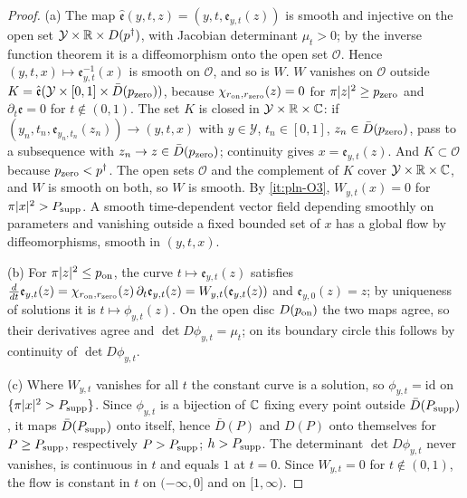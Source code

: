 \begin{proof}
(a) The map $\hat{\mathfrak e}(y,t,z)=(y,t,\mathfrak e_{y,t}(z))$ is smooth and injective on the open set
$\mathcal Y\times\mathbb{R}\times D(p^\dagger)$, with Jacobian determinant $\mu_t>0$; by the inverse function theorem it is a
diffeomorphism onto the open set $\mathcal O$. Hence $(y,t,x)\mapsto\mathfrak e_{y,t}^{-1}(x)$ is smooth on $\mathcal O$, and so is $W$.
$W$ vanishes on $\mathcal O$ outside $K=\hat{\mathfrak e}(\mathcal Y\times[0,1]\times\bar D(p_{\rm zero}))$, because $\chi_{r_{\rm on},r_{\rm zero}}(z)=0$ for
$\pi|z|^2\ge p_{\rm zero}$ and $\partial_t\mathfrak e=0$ for $t\notin(0,1)$. The set $K$ is closed in $\mathcal Y\times\mathbb{R}\times\mathbb{C}$: if
$(y_n,t_n,\mathfrak e_{y_n,t_n}(z_n))\to(y,t,x)$ with $y\in\mathcal Y$, $t_n\in[0,1]$, $z_n\in\bar D(p_{\rm zero})$, pass to a subsequence
with $z_n\to z\in\bar D(p_{\rm zero})$; continuity gives $x=\mathfrak e_{y,t}(z)$. And $K\subset\mathcal O$ because $p_{\rm zero}<p^\dagger$.
The open sets $\mathcal O$ and the complement of $K$ cover $\mathcal Y\times\mathbb{R}\times\mathbb{C}$, and $W$ is smooth on both, so $W$ is
smooth. By \ref{it:pln-O3}, $W_{y,t}(x)=0$ for $\pi|x|^2>P_{\rm supp}$. A smooth time-dependent vector field depending smoothly
on parameters and vanishing outside a fixed bounded set of $x$ has a global flow by diffeomorphisms, smooth in
$(y,t,x)$.

(b) For $\pi|z|^2\le p_{\rm on}$, the curve $t\mapsto\mathfrak e_{y,t}(z)$ satisfies
$\frac d{dt}\mathfrak e_{y,t}(z)=\chi_{r_{\rm on},r_{\rm zero}}(z)\,\partial_t\mathfrak e_{y,t}(z)=W_{y,t}(\mathfrak e_{y,t}(z))$ and $\mathfrak e_{y,0}(z)=z$; by uniqueness of
solutions it is $t\mapsto\phi_{y,t}(z)$. On the open disc $D(p_{\rm on})$ the two maps agree, so their derivatives agree and
$\det D\phi_{y,t}=\mu_t$; on its boundary circle this follows by continuity of $\det D\phi_{y,t}$.

(c) Where $W_{y,t}$ vanishes for all $t$ the constant curve is a solution, so $\phi_{y,t}=\mathrm{id}$ on $\{\pi|x|^2>P_{\rm supp}\}$.
Since $\phi_{y,t}$ is a bijection of $\mathbb{C}$ fixing every point outside $\bar D(P_{\rm supp})$, it maps $\bar D(P_{\rm supp})$ onto itself,
hence $\bar D(P)$ and $D(P)$ onto themselves for $P\ge P_{\rm supp}$, respectively $P>P_{\rm supp}$; $h>P_{\rm supp}$. The determinant
$\det D\phi_{y,t}$ never vanishes, is continuous in $t$ and equals $1$ at $t=0$. Since $W_{y,t}=0$ for $t\notin(0,1)$, the
flow is constant in $t$ on $(-\infty,0]$ and on $[1,\infty)$.
\end{proof}

